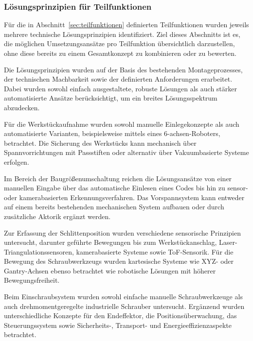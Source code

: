 \subsubsection{Lösungsprinzipien für Teilfunktionen}
\label{sec:teilfuktionenlösungen}
Für die in Abschnitt~\ref{sec:teilfunktionen} definierten Teilfunktionen wurden jeweils mehrere technische Lösungsprinzipien identifiziert. Ziel dieses Abschnitts ist es, die möglichen Umsetzungsansätze pro Teilfunktion übersichtlich darzustellen, ohne diese bereits zu einem Gesamtkonzept zu kombinieren oder zu bewerten.\cite{MKon_VL, PahlBeitz, ZwickyMorphology}

Die Lösungsprinzipien wurden auf der Basis des bestehenden Montageprozesses, der technischen Machbarkeit sowie der definierten Anforderungen erarbeitet. Dabei wurden sowohl einfach ausgestaltete, robuste Lösungen als auch stärker automatisierte Ansätze berücksichtigt, um ein breites Lösungsspektrum abzudecken.

Für die Werkstückaufnahme wurden sowohl manuelle Einlegekonzepte als auch automatisierte Varianten, beispielsweise mittels eines 6-achsen-Roboters, betrachtet. Die Sicherung des Werkstücks kann mechanisch über Spannvorrichtungen mit Passstiften oder alternativ über Vakuumbasierte Systeme erfolgen.

Im Bereich der Baugrößenumschaltung reichen die Lösungsansätze von einer manuellen Eingabe über das automatische Einlesen eines Codes bis hin zu sensor- oder kamerabasierten Erkennungsverfahren. Das Vorspannsystem kann entweder auf einem bereits bestehenden mechanischen System aufbauen oder durch zusätzliche Aktorik ergänzt werden.

Zur Erfassung der Schlittenposition wurden verschiedene sensorische Prinzipien untersucht, darunter geführte Bewegungen bis zum Werkstückanschlag, Laser-Triangulations\-sensoren, kamerabasierte Systeme sowie ToF-Sensorik. Für die Bewegung des Schraubwerkzeugs wurden kartesische Systeme wie XYZ- oder Gantry-Achsen ebenso betrachtet wie robotische Lösungen mit höherer Bewegungsfreiheit.

Beim Einschraubsystem wurden sowohl einfache manuelle Schraubwerkzeuge als auch drehmomentgeregelte industrielle Schrauber untersucht. Ergänzend wurden unterschiedliche Konzepte für den Endeffektor, die Positionsüberwachung, das Steuerungssystem sowie Sicherheits-, Transport- und Energieeffizienzaspekte betrachtet.\\\\

